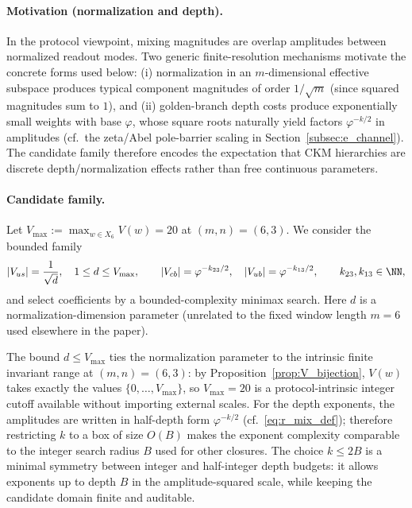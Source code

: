 \paragraph{Motivation (normalization and depth).}
In the protocol viewpoint, mixing magnitudes are overlap amplitudes between normalized readout modes.
Two generic finite-resolution mechanisms motivate the concrete forms used below:
(i) normalization in an $m$-dimensional effective subspace produces typical component magnitudes of order $1/\sqrt{m}$ (since squared magnitudes sum to $1$), and
(ii) golden-branch depth costs produce exponentially small weights with base $\varphi$, whose square roots naturally yield factors $\varphi^{-k/2}$ in amplitudes (cf.\ the zeta/Abel pole-barrier scaling in Section~\ref{subsec:e_channel}).
The candidate family therefore encodes the expectation that CKM hierarchies are discrete depth/normalization effects rather than free continuous parameters.

\paragraph{Candidate family.}
Let $V_{\max}:=\max_{w\in X_6}V(w)=20$ at $(m,n)=(6,3)$.
We consider the bounded family
\begin{equation}\label{eq:ckm_candidate_family}
|V_{us}|=\frac{1}{\sqrt{d}},\quad 1\le d\le V_{\max},
\qquad
|V_{cb}|=\varphi^{-k_{23}/2},\quad |V_{ub}|=\varphi^{-k_{13}/2},
\qquad k_{23},k_{13}\in\NN,
\end{equation}
and select coefficients by a bounded-complexity minimax search.
Here $d$ is a normalization-dimension parameter (unrelated to the fixed window length $m=6$ used elsewhere in the paper).

\begin{remark}\label{rem:ckm_bounds_rationale}
The bound $d\le V_{\max}$ ties the normalization parameter to the intrinsic finite invariant range at $(m,n)=(6,3)$: by Proposition~\ref{prop:V_bijection}, $V(w)$ takes exactly the values $\{0,\dots,V_{\max}\}$, so $V_{\max}=20$ is a protocol-intrinsic integer cutoff available without importing external scales.
For the depth exponents, the amplitudes are written in half-depth form $\varphi^{-k/2}$ (cf.\ \eqref{eq:r_mix_def}); therefore restricting $k$ to a box of size $O(B)$ makes the exponent complexity comparable to the integer search radius $B$ used for other closures.
The choice $k\le 2B$ is a minimal symmetry between integer and half-integer depth budgets: it allows exponents up to depth $B$ in the amplitude-squared scale, while keeping the candidate domain finite and auditable.
\end{remark}

